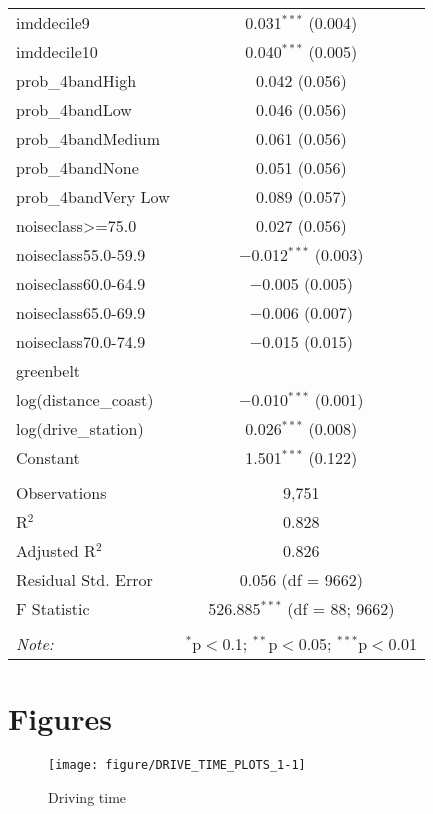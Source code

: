 \documentclass{article}\usepackage[]{graphicx}\usepackage[]{color}
\newenvironment{knitrout}{}{} %
\begin{document}
\begin{table}[!htbp]
\begin{tabular}{@{\extracolsep{5pt}}lc}
  imddecile9 & 0.031$^{***}$ (0.004) \\ 
  imddecile10 & 0.040$^{***}$ (0.005) \\ 
  prob\_4bandHigh & 0.042 (0.056) \\ 
  prob\_4bandLow & 0.046 (0.056) \\ 
  prob\_4bandMedium & 0.061 (0.056) \\ 
  prob\_4bandNone & 0.051 (0.056) \\ 
  prob\_4bandVery Low & 0.089 (0.057) \\ 
  noiseclass\textgreater =75.0 & 0.027 (0.056) \\ 
  noiseclass55.0-59.9 & $-$0.012$^{***}$ (0.003) \\ 
  noiseclass60.0-64.9 & $-$0.005 (0.005) \\ 
  noiseclass65.0-69.9 & $-$0.006 (0.007) \\ 
  noiseclass70.0-74.9 & $-$0.015 (0.015) \\ 
  greenbelt &  \\ 
  log(distance\_coast) & $-$0.010$^{***}$ (0.001) \\ 
  log(drive\_station) & 0.026$^{***}$ (0.008) \\ 
  Constant & 1.501$^{***}$ (0.122) \\ 
 \hline \\[-1.8ex] 
Observations & 9,751 \\ 
R$^{2}$ & 0.828 \\ 
Adjusted R$^{2}$ & 0.826 \\ 
Residual Std. Error & 0.056 (df = 9662) \\ 
F Statistic & 526.885$^{***}$ (df = 88; 9662) \\ 
\hline 
\hline \\[-1.8ex] 
\textit{Note:}  & \multicolumn{1}{r}{$^{*}$p$<$0.1; $^{**}$p$<$0.05; $^{***}$p$<$0.01} \\ 
\end{tabular} 
\end{table} 

\pagebreak
\section{Figures}


\begin{knitrout}\scriptsize
{}\color{fgcolor}\begin{figure}
\texttt{[image: figure/DRIVE\_TIME\_PLOTS\_1-1]} \caption[Driving time]{Driving time}\label{fig:DRIVE_TIME_PLOTS_1}
\end{figure}


\end{knitrout}
\end{document}
